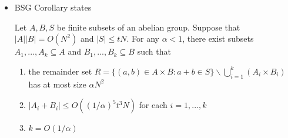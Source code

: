 \documentclass{article}
\begin{document}
\begin{itemize}
    \item BSG Corollary states
    
    Let $A,B,S$ be finite subsets of an abelian group. Suppose that $|A||B| = O(N^2)$ and $|S| \leq tN$. For any $\alpha < 1$, there exist subsets $A_1, ... , A_k \subseteq A$ and $B_1, ... , B_k \subseteq B$ such that
    \begin{enumerate}
        \item the remainder set $R = \{(a,b) \in A \times B : a+b \in S\} \backslash \bigcup_{i=1}^k (A_i \times B_i)$ has at most size $\alpha N^2$
        \item $|A_i + B_i| \leq O((1/\alpha)^5t^3N)$ for each $i=1,...,k$
        \item $k = O(1/\alpha)$
    \end{enumerate}
    

\end{itemize}
\end{document}

